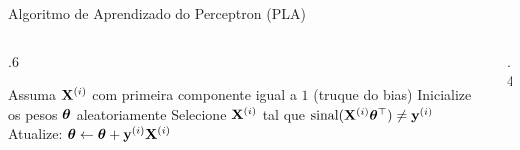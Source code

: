 \documentclass[aspectratio=169,xcolor=dvipsnames]{beamer}
\begin{document}
\begin{frame}{Algoritmo de Aprendizado do Perceptron (PLA)}

\begin{columns}
    \begin{column}{.6\textwidth}
        \begin{algorithmic}[1]
            \State Assuma $\mathbf{X}^{(i)}$ com primeira componente igual a $1$ (truque do bias)
            \State Inicialize os pesos $\bm{\theta}$ aleatoriamente
              \State Selecione $\mathbf{X}^{(i)}$ tal que $\text{sinal}(\mathbf{X}^{(i)} \bm{\theta}^\top) \neq \mathbf{y}^{(i)}$
              \State Atualize: $\bm{\theta} \gets \bm{\theta} + \mathbf{y}^{(i)} \mathbf{X}^{(i)}$
            \EndWhile
        \end{algorithmic}
    \centering
    \resizebox{.5\linewidth}{!}{
        
    }    
    \end{column}
    \begin{column}{.4\textwidth}
    \centering
    \providecommand{\figfuncdecision}{x*x}

    \resizebox{\linewidth}{!}{
        
    }
    \end{column}
\end{columns}
    
\end{frame}
\end{document}
